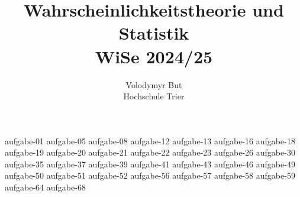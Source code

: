 \documentclass[10pt, oneside]{article}
\title{Wahrscheinlichkeitstheorie und Statistik\\[10pt]\Large{WiSe 2024/25}}
\author{Volodymyr But\\[10pt]Hochschule Trier}
\date{}
\begin{document}
\maketitle
\vspace{25px}

{aufgabe-01}
\pagebreak
{aufgabe-05}
\pagebreak
{aufgabe-08}
\pagebreak
{aufgabe-12}
\pagebreak
{aufgabe-13}
{aufgabe-16}
{aufgabe-18}
\pagebreak
{aufgabe-19}
{aufgabe-20}
\vspace{5px}
{aufgabe-21}
{aufgabe-22}
{aufgabe-23}
{aufgabe-26}
{aufgabe-30}
{aufgabe-35}
{aufgabe-37}
{aufgabe-39}
\vspace{5px}
{aufgabe-41}
{aufgabe-43}
\pagebreak
{aufgabe-46}
\pagebreak
{aufgabe-49}
{aufgabe-50}
{aufgabe-51}
\pagebreak
{aufgabe-52}
{aufgabe-56}
{aufgabe-57}
{aufgabe-58}
{aufgabe-59}
\pagebreak
{aufgabe-64}
{aufgabe-68}
\end{document}
